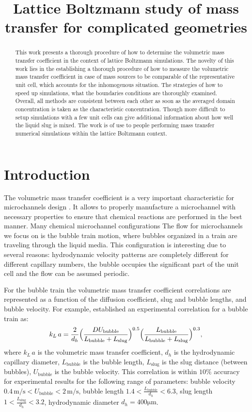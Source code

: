 \documentclass{article}
\title{Lattice Boltzmann study of mass transfer for complicated geometries}
\newcommand{\vol}{k_L\,a}
\newcommand{\lbubble}{L_{\mathrm{bubble}}}
\newcommand{\lslug}{L_{\mathrm{slug}}}
\newcommand{\ububble}{U_{\mathrm{bubble}}}
\begin{document}
\maketitle
\begin{abstract}
This work presents a thorough procedure of how to determine the volumetric mass transfer
coefficient
in the context of lattice Boltzmann simulations. The novelty of this work lies in the establishing
a thorough procedure of how to measure the volumetric mass transfer coefficient in case of mass
sources to be comparable of the representative unit cell, which accounts for the inhomogenous
situation. The strategies of how to speed up simulations, what the boundaries conditions are
thoroughly examined. Overall, all methods are consistent between each other as soon as the averaged
domain concentration is taken as the characteristic concentration. Though more difficult to setup
simulations with a few unit cells can give additional information about how well the liquid slug is
mixed. The work is of use to people performing mass transfer numerical simulations within the
lattice Boltzmann context.
\end{abstract}

\section{Introduction}
The volumetric mass transfer coefficient is a very important characteristic for microchannels 
design \cite{kreutzer-overview}. It allows to
properly manufacture a microchannel with necessary properties to ensure that chemical
reactions are performed in the best manner. Many chemical microchannel configurations
\cite{kreutzer-pressure-drop}  The flow for microchannels we focus on is the bubble train
motion, where bubbles organized in a train are traveling through the liquid media. This
configuration is interesting due to several reasons: hydrodynamic velocity patterns are completely
different for different capillary numbers, the bubble occupies the significant part of the unit cell
and the flow can be assumed periodic. 

For the bubble train the volumetric mass transfer coefficient correlations are represented as a
function of the diffusion coefficient, slug and bubble lengths, and bubble velocity. For example,
\citet{yue-mass} established an experimental correlation for a bubble train as: 
\begin{equation}
\vol =\frac{2}{d_h} \Bigl(\frac{D
\ububble}{\lbubble+\lslug}\Bigr)^{0.5}
\Bigl(\frac{\lbubble}{\lbubble+\lslug}\Bigr)^{0.3},
\end{equation}
where $\vol$ is the volumetric mass transfer coefficient, $d_h$ is the hydrodynamic capillary
diameter, $\lbubble$ is the bubble length, $\lslug$ is the slug distance (between bubbles),
$\ububble$ is the bubble velocity. This correlation is within $10\%$ accuracy for experimental
results for the following range of
parameters: bubble velocity $0.4\,\mathrm{m/s}<\ububble<2\,\mathrm{m/s}$, bubble length
$1.4<\frac{\lbubble}{d_h}<6.3$, slug length $1<\frac{\lslug}{d_h}<3.2$,
hydrodynamic diameter $d_h = 400 \mathrm{\mu m}$.
\end{document}
